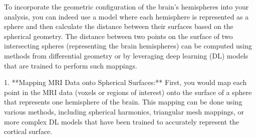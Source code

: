 \documentclass[twocolumn]{article}
\begin{document}
\begin{comment}
4. **Considering Attenuation with Distance:**
In addition to normalizing by distance, you may also want to consider signal attenuation with distance,
which can be modeled using an inverse distance weighting function or a decay function based on the signal's properties (e.g., electromagnetic signal propagation in the brain).
5. **Combining Functional and Structural Connectivity:**
Integrating functional connectivity measures with structural information (like distance) can provide a
more comprehensive understanding of neural dynamics. This approach can be particularly useful in neuroimaging where both types of data are often available.
6. **Statistical Correction:**
Finally, it's important to correct for multiple comparisons if you're testing many pairs of regions or time
points. Methods like false discovery rate (FDR) or Bonferroni correction can be applied to control the family-wise error rate.
By incorporating distance information into your FFT correlation measure, you can create a more nuanced model that accounts for both the functional and anatomical aspects of brain connectivity. This approach can lead to more accurate models of brain network dynamics and potentially identify meaningful patterns of connectivity that are robust to spatial variation.
\end{comment}

To incorporate the geometric configuration of the brain's hemispheres into your analysis, you can indeed use a model where each hemisphere is represented as a sphere and then calculate the distance between their surfaces based on the spherical geometry. The distance between two points on the surface of two intersecting spheres (representing the brain hemispheres) can be computed using methods from differential geometry or by leveraging deep learning (DL) models that are trained to perform such mappings.

1. **Mapping MRI Data onto Spherical Surfaces:**
First, you would map each point in the MRI data (voxels or regions of interest) onto the surface of a
sphere that represents one hemisphere of the brain. This mapping can be done using various methods, including spherical harmonics, triangular mesh mappings, or more complex DL models that have been trained to accurately represent the cortical surface.
\end{document}
